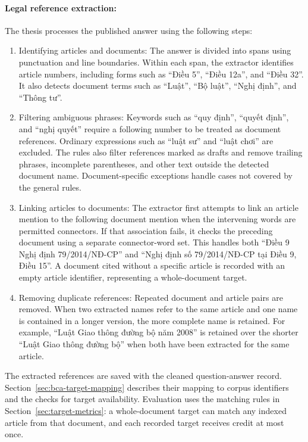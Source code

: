 \paragraph{Legal reference extraction:}
The thesis processes the published answer using the following steps:
\begin{enumerate}
    \item Identifying articles and documents: The answer is divided into spans using punctuation and line boundaries. Within each span, the extractor identifies article numbers, including forms such as ``Điều 5'', ``Điều 12a'', and ``Điều 32''. It also detects document terms such as ``Luật'', ``Bộ luật'', ``Nghị định'', and ``Thông tư''.

    \item Filtering ambiguous phrases: Keywords such as ``quy định'', ``quyết định'', and ``nghị quyết'' require a following number to be treated as document references. Ordinary expressions such as ``luật sư'' and ``luật chơi'' are excluded. The rules also filter references marked as drafts and remove trailing phrases, incomplete parentheses, and other text outside the detected document name. Document-specific exceptions handle cases not covered by the general rules.

    \item Linking articles to documents: The extractor first attempts to link an article mention to the following document mention when the intervening words are permitted connectors. If that association fails, it checks the preceding document using a separate connector-word set. This handles both ``Điều 9 Nghị định 79/2014/NĐ-CP'' and ``Nghị định số 79/2014/NĐ-CP tại Điều 9, Điều 15''. A document cited without a specific article is recorded with an empty article identifier, representing a whole-document target.

    \item Removing duplicate references: Repeated document and article pairs are removed. When two extracted names refer to the same article and one name is contained in a longer version, the more complete name is retained. For example, ``Luật Giao thông đường bộ năm 2008'' is retained over the shorter ``Luật Giao thông đường bộ'' when both have been extracted for the same article.
\end{enumerate}

The extracted references are saved with the cleaned question-answer record. Section~\ref{sec:bca-target-mapping} describes their mapping to corpus identifiers and the checks for target availability. Evaluation uses the matching rules in Section~\ref{sec:target-metrics}: a whole-document target can match any indexed article from that document, and each recorded target receives credit at most once.

